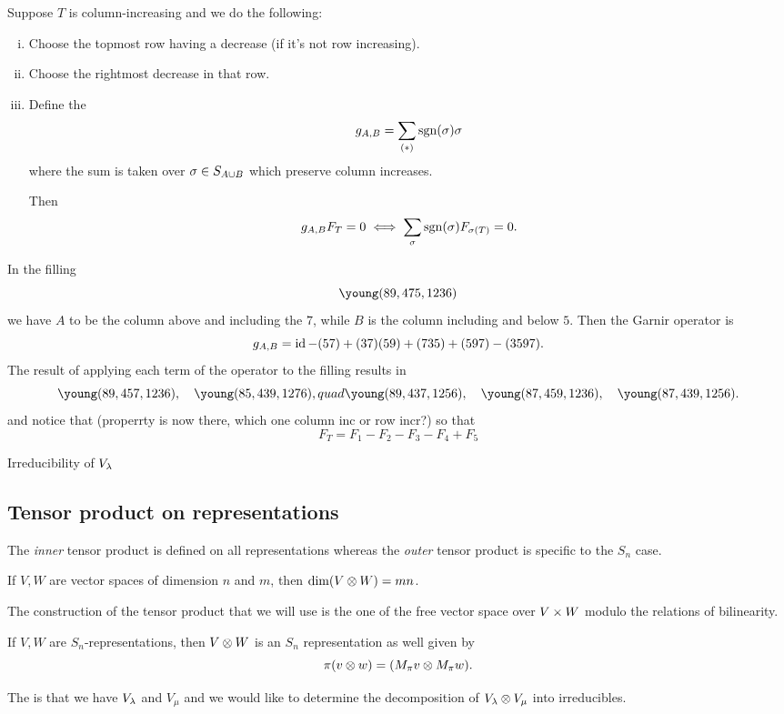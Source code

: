 \documentclass[12pt]{memoir}
\begin{document}
\begin{Lem}
    Suppose $T$ is column-increasing and we do the following:
    \begin{enumerate}[i)]
        \itemsep=-0.4em
        \item Choose the topmost row having a decrease (if it's not row increasing).
        \item Choose the rightmost decrease in that row.
        \item Define the 
        $$g_{A,B}=\sum_{(\ast)}\operatorname{sgn}(\sigma)\sigma$$
        where the sum is taken over $\sigma\in S_{A\cup B}$ which preserve column increases.\par 
        Then 
        $$g_{A,B}F_T=0\iff \sum_\sigma\operatorname{sgn}(\sigma)F_{\sigma(T)}=0.$$
    \end{enumerate}
\end{Lem}

\begin{Ex}
    In the filling  
    $$\young(89,475,1236)$$
    we have $A$ to be the column above and including the $7$, while $B$ is the column including and below $5$. Then the Garnir operator is 
    $$g_{A,B}=\operatorname{id}-(57)+(37)(59)+(735)+(597)-(3597).$$
    The result of applying each term of the operator to the filling results in 
    $$\young(89,457,1236),\quad\young(85,439,1276),quad\young(89,437,1256),\quad\young(87,459,1236),\quad\young(87,439,1256).$$
    and notice that (properrty is now there, which one column inc or row incr?) so that 
    $$F_T=F_1-F_2-F_3-F_4+F_5$$
\end{Ex}

\begin{Prop}
    Irreducibility of $V_\lambda$
\end{Prop}

\subsection{Tensor product on representations}

The \emph{inner} tensor product is defined on all representations whereas the \emph{outer} tensor product is specific to the $S_n$ case. 

\begin{Prop}
    If $V,W$ are vector spaces of dimension $n$ and $m$, then $\dim(V\otimes W)=mn$.   
\end{Prop}

The construction of the tensor product that we will use is the one of the free vector space over $V\times W$ modulo the relations of bilinearity.

\begin{Prop}
    If $V,W$ are $S_n$-representations, then $V\otimes W$ is an $S_n$ representation as well given by 
    $$\pi(v\otimes w)=(M_\pi v\otimes M_\pi w).$$
\end{Prop}

The  is that we have $V_\lambda$ and $V_\mu$ and we would like to determine the decomposition of $V_\lambda\otimes V_\mu$ into irreducibles.
\ifx\nextra\undefined
\printindex
\else\fi
\nocite{*}


\end{document}
